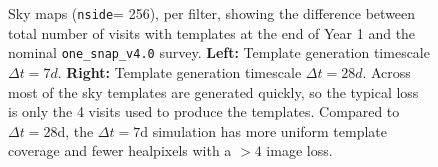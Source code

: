 \documentclass[preprintm,linenumbers]{aastex631}
\newcommand{\baseline}{\texttt{one\_snap\_v4.0}\xspace}
\newcommand{\nside}{\texttt{nside}\xspace}
\begin{document}
\begin{figure}
\begin{tabular}{c c c}
			\end{tabular}
			\caption{Sky maps (\nside = 256), per filter, showing the  difference between total number of visits with templates at the end of Year 1 and the nominal \baseline survey. \textbf{Left:} Template generation timescale $\Delta t = 7 \si{d}$.  \textbf{Right:} Template generation timescale $\Delta t = 28 \si{d}$. Across most of the sky templates are generated quickly, so the typical loss is only the 4 visits used to produce the templates. 
   Compared to $\Delta t = 28$d, the $\Delta t = 7$d simulation has more uniform template coverage and fewer healpixels with a $>4$ image loss.  
			}
			\label{fig:template_skymaps_delta-7_28days}
		\end{figure}

		
		
\end{document}
